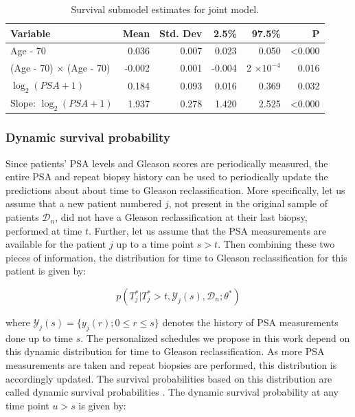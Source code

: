 \begin{table}[!htb]
\centering
\caption{Survival submodel estimates for joint model.}
\captionsetup{justification=centering}
\label{tab : PSA_survival}
\begin{tabular}{@{}lrrrrr@{}}
\toprule
Variable                      & Mean   & Std. Dev & 2.5\%  & 97.5\%                 & P              \\ \midrule
Age - 70                      & 0.036  & 0.007    & 0.023  & 0.050                  & \textless0.000 \\
(Age - 70) $\times$ (Age - 70) & -0.002 & 0.001    & -0.004 & 2 $\times 10^{-4}$ & 0.016          \\
$\log_2(PSA + 1)$                  & 0.184  & 0.093    & 0.016 & 0.369                  & 0.032          \\
Slope: $\log_2(PSA + 1)$           & 1.937  & 0.278    & 1.420  & 2.525                  & \textless0.000 \\ \bottomrule
\end{tabular}
\end{table}

\subsubsection{Dynamic survival probability}
\label{subsubsec: dyn_surv_prob}
Since patients' PSA levels and Gleason scores are periodically measured, the entire PSA and repeat biopsy history can be used to periodically update the predictions about about time to Gleason reclassification. More specifically, let us assume that a new patient numbered $j$, not present in the original sample of patients $\mathcal{D}_n$, did not have a Gleason reclassification at their last biopsy, performed at time $t$. Further, let us assume that the PSA measurements are available for the patient $j$ up to a time point $s > t$. Then combining these two pieces of information, the distribution for time to Gleason reclassification for this patient is given by:

\begin{equation}
p(T^*_j | T^*_j > t, \mathcal{Y}_j(s), \mathcal{D}_n; \theta^*)
\end{equation}

where $\mathcal{Y}_j(s) = \{y_j(r); 0 \leq r \leq s\}$ denotes the history of PSA measurements done up to time $s$. The personalized schedules we propose in this work depend on this dynamic distribution for time to Gleason reclassification. As more PSA measurements are taken and repeat biopsies are performed, this distribution is accordingly updated. The survival probabilities based on this distribution are called dynamic survival probabilities \cite{rizopoulos2011dynamic}. The dynamic survival probability at any time point $u > s$ is given by:

